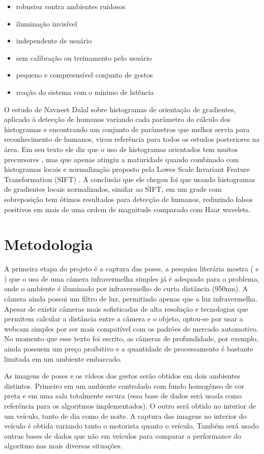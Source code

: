 \begin{itemize}
\item robustez contra ambientes ruidosos
\item iluminação invisível
\item independente de usuário
\item sem calibração ou treinamento pelo usuário
\item pequeno e compreensível conjunto de gestos
\item reação do sistema com o mínimo de latência
\end{itemize}

O estudo de Navneet Dalal \cite{dalal} sobre histogramas de orientação de gradientes, aplicado à detecção de humanos variando cada parâmetro do cálculo dos histogramas e encontrando um conjunto de parâmetros que melhor servia para reconhecimento de humanos, virou referência para todos os estudos posteriores na área. Em seu texto ele diz que o uso de histogramas orientados tem muitos precursores \cite{ref3} \cite{ref4}, mas que apenas atingiu a maturidade quando combinado com histogramas locais e normalização proposto pela Lowes Scale Invariant Feature Transformation (SIFT) \cite{ref15}. A conclusão que ele chegou foi que usando histogramas de gradientes locais normalizados, similar ao SIFT, em um grade com sobreposição tem ótimos resultados para detecção de humanos, reduzindo falsos positivos em mais de uma ordem de magnitude comparado com Haar wavelets.

\section{Metodologia}

A primeira etapa do projeto é a captura das poses, a pesquisa literária mostra (\cite{ref1} e \cite{ref2}) que o uso de uma câmera infravermelha simples já é adequado para o problema, onde o ambiente é iluminado por infravermelho de curta distância (950nm). A câmera ainda possui um filtro de luz, permitindo apenas que a luz infravermelha. Apesar de existir câmeras mais sofisticadas de alta resolução e tecnologias que permitem calcular a distância entre a câmera e o objeto, optou-se por usar a webcam simples por ser mais compatível com os padrões de mercado automotivo. No momento que esse texto foi escrito, as câmeras de profundidade, por exemplo, ainda possuem um preço proibitivo e a quantidade de processamento é bastante limitada em um ambiente embarcado.

As imagens de poses e os vídeos dos gestos serão obtidos em  dois ambientes distintos. Primeiro em um ambiente controlado com fundo homogêneo de cor preta e em uma sala totalmente escura (essa base de dados será usada como referência para os algoritmos implementados). O outro será obtido no interior de um veículo, tanto de dia como de noite. A captura das imagens no interior do veículo é obtida variando tanto o motorista quanto o veículo. Também será usado outras bases de dados que não em veículos para comparar a performance do algoritmo nas mais diversas situações.

